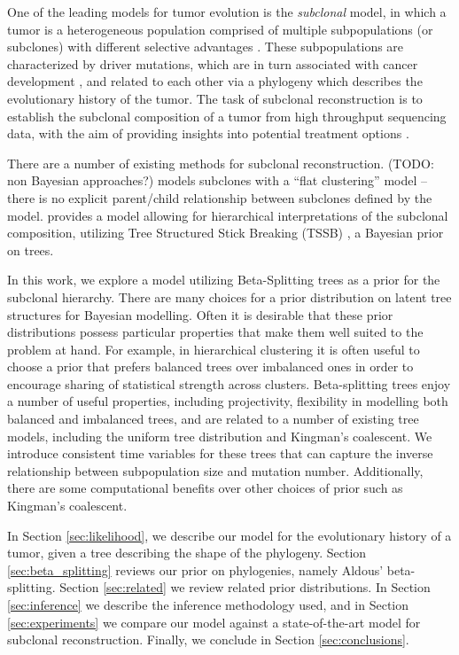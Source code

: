 \documentclass{bioinfo}
\begin{document}
One of the leading models for tumor evolution is the \emph{subclonal} model, in which a tumor is a heterogeneous population comprised of multiple subpopulations (or subclones) with different selective advantages \cite{Pritchard2000, Shah2012, Jiao2014}.  These subpopulations are characterized by driver mutations, which are in turn associated with cancer development  \cite{Hanahan2000, Hanahan2011}, and related to each other via a phylogeny which describes the evolutionary history of the tumor.  The task of subclonal reconstruction is to establish the subclonal composition of a tumor from high throughput sequencing data, with the aim of providing insights into potential treatment options \cite{Aparicio2013, Bedard2013}.

There are a number of existing methods for subclonal reconstruction.  (TODO: non Bayesian approaches?) \cite{Shah2012} models subclones with a ``flat clustering'' model -- there is no explicit parent/child relationship between subclones defined by the model.  \cite{Jiao2014} provides a model allowing for hierarchical interpretations of the subclonal composition, utilizing Tree Structured Stick Breaking (TSSB) \cite{adams2010tssb}, a Bayesian prior on trees. 

In this work, we explore a model utilizing Beta-Splitting trees \cite{Aldous1995} as a prior for the subclonal hierarchy.  There are many choices for a prior distribution on latent tree structures for Bayesian modelling.  Often it is desirable that these prior distributions possess particular properties that make them well suited to the problem at hand.  For example, in hierarchical clustering it is often useful to choose a prior that prefers balanced trees over imbalanced ones in order to encourage sharing of statistical strength across clusters.  Beta-splitting trees enjoy a number of useful properties, including projectivity, flexibility in modelling both balanced and imbalanced trees, and are related to a number of existing tree models, including the uniform tree distribution and Kingman's coalescent.  We introduce consistent time variables for these trees that can capture the inverse relationship between subpopulation size and mutation number.  Additionally, there are some computational benefits over other choices of prior such as Kingman's coalescent.

In Section \ref{sec:likelihood}, we describe our model for the evolutionary history of a tumor, given a tree describing the shape of the phylogeny.  Section \ref{sec:beta_splitting} reviews our prior on phylogenies, namely Aldous' beta-splitting.  Section \ref{sec:related} we review related prior distributions.  In Section \ref{sec:inference} we describe the inference methodology used, and in Section \ref{sec:experiments} we compare our model against a state-of-the-art model for subclonal reconstruction.  Finally, we conclude in Section \ref{sec:conclusions}. 
\end{document}
